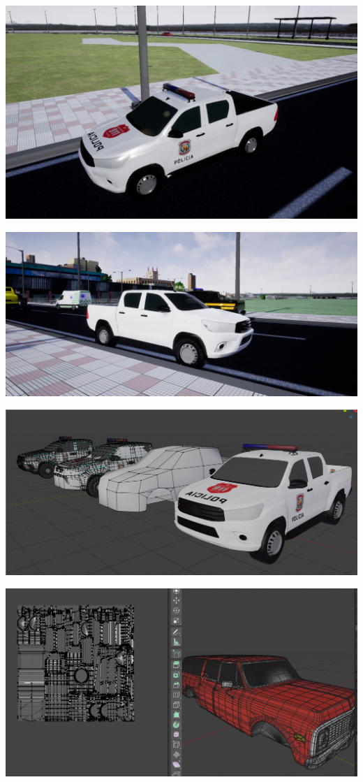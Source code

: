 \documentclass{article}
\begin{document}
  \includegraphics[width=\textwidth]{63.jpg}
  
  \includegraphics[width=\textwidth]{67.jpg}
  
  \includegraphics[width=\textwidth]{72.png}

  \includegraphics[width=\textwidth]{64.png}
  
\end{document}
